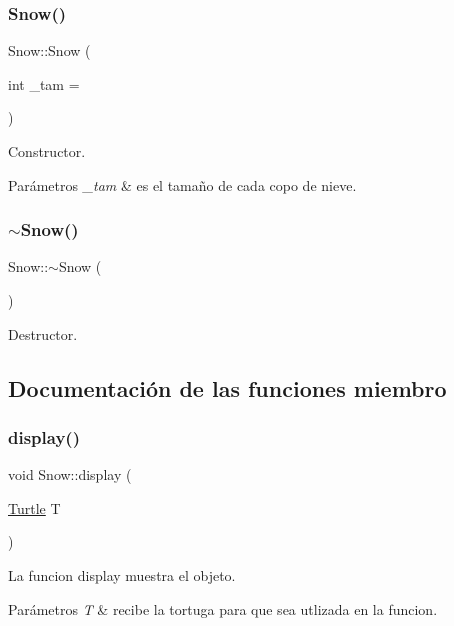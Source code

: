 \subsubsection{\texorpdfstring{Snow()}{Snow()}}
{\footnotesize\ttfamily Snow\+::\+Snow (\begin{DoxyParamCaption}\item[{int}]{\+\_\+tam = {} }\end{DoxyParamCaption})}

Constructor. 
\begin{DoxyParams}{Parámetros}
{\em \+\_\+tam} & es el tamaño de cada copo de nieve. \\
\hline
\end{DoxyParams}
\mbox{\label{classSnow_a8bf279bbf1ddd5b180692797996ce7b5}} 
\subsubsection{\texorpdfstring{$\sim$\+Snow()}{~Snow()}}
{\footnotesize\ttfamily Snow\+::$\sim$\+Snow (\begin{DoxyParamCaption}{ }\end{DoxyParamCaption})}

Destructor. 

\subsection{Documentación de las funciones miembro}
\mbox{\label{classSnow_a624263662e99a3d80022a86be73588f2}} 
\subsubsection{\texorpdfstring{display()}{display()}}
{\footnotesize\ttfamily void Snow\+::display (\begin{DoxyParamCaption}\item[{\hyperlink{classTurtle}{Turtle}}]{T }\end{DoxyParamCaption})}

La funcion display muestra el objeto. 
\begin{DoxyParams}{Parámetros}
{\em T} & recibe la tortuga para que sea utlizada en la funcion. \\
\hline
\end{DoxyParams}
\mbox{\label{classSnow_a441e42b0e5cee4d21220b243e08b344d}} 
